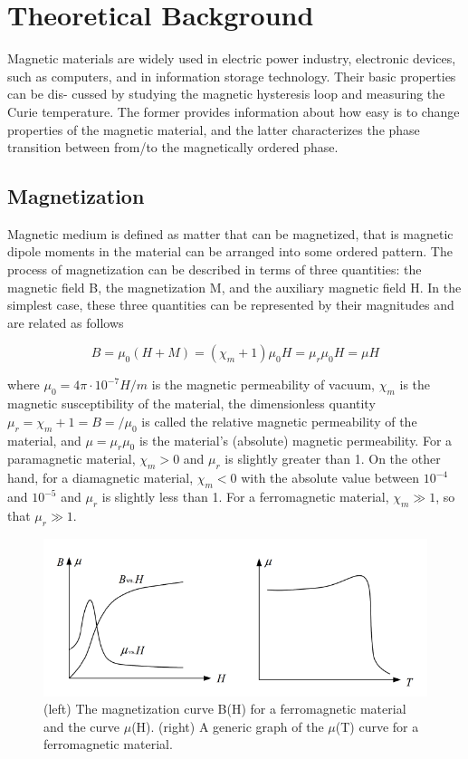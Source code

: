 \documentclass{article}
\begin{document}
\section{Theoretical Background}

Magnetic materials are widely used in electric power industry, electronic devices, such
as computers, and in information storage technology. Their basic properties can be dis-
cussed by studying the magnetic hysteresis loop and measuring the Curie temperature.
The former provides information about how easy is to change properties of the magnetic
material, and the latter characterizes the phase transition between from/to the magnetically ordered phase.


\subsection{Magnetization}

Magnetic medium is defined as matter that can be magnetized, that is magnetic dipole
moments in the material can be arranged into some ordered pattern. The process of
magnetization can be described in terms of three quantities: the magnetic field B, the
magnetization M, and the auxiliary magnetic field H. In the simplest case, these three
quantities can be represented by their magnitudes and are related as follows

$$B=\mu_0(H+M)=(\chi_m+1)\mu_0H=\mu_r\mu_0H=\mu H$$

where $\mu_0 = 4\pi \cdot 10^{-7} H/m$ is the magnetic permeability of vacuum, $\chi_m$ is the magnetic
susceptibility of the material, the dimensionless quantity $\mu_r = \chi_m+1 = B=/\mu_0 $ is called the
relative magnetic permeability of the material, and $\mu = \mu_r\mu_0$ is the material's (absolute)
magnetic permeability. For a paramagnetic material, $\chi_m > 0$ and $\mu_r$ is slightly greater
than 1. On the other hand, for a diamagnetic material, $\chi_m < 0$ with the absolute value
between $10^{-4}$ and $10^{-5}$ and $\mu_r$ is slightly less than 1. For a ferromagnetic material,
$\chi_m \gg 1$, so that $\mu_r \gg 1$.

\begin{figure}[H]
	\centering
	\includegraphics[scale=0.6]{fig1.png}
	\caption{(left) The magnetization curve B(H) for a ferromagnetic material and the
curve $\mu$(H). (right) A generic graph of the $\mu$(T) curve for a ferromagnetic material.}
\end{figure}
\end{document}
